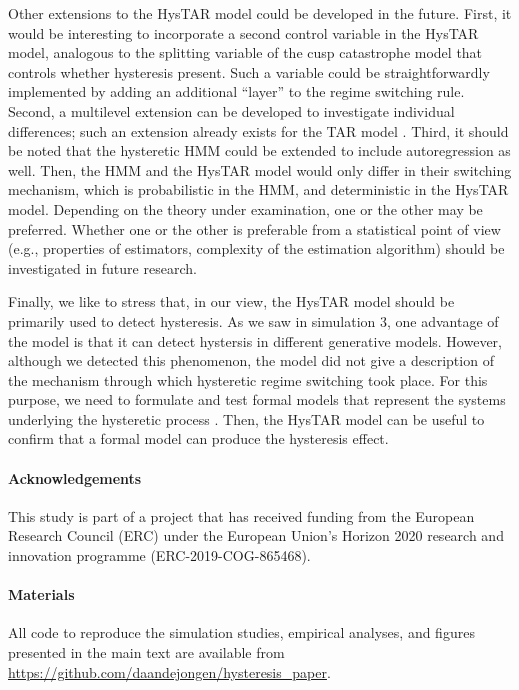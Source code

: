 \documentclass{article}
\begin{document}
Other extensions to the HysTAR model could be developed in the future.
First, it would be interesting to incorporate a second control variable in the HysTAR model, analogous to the splitting variable of the cusp catastrophe model that controls whether hysteresis present.
Such a variable could be straightforwardly implemented by adding an additional ``layer'' to the regime switching rule.
Second, a multilevel extension can be developed to investigate individual differences; such an extension already exists for the TAR model \citep{tar_affect_dyadic1}.
Third, it should be noted that the hysteretic HMM could be extended to include autoregression as well. Then, the HMM and the HysTAR model would only differ in their switching mechanism, which is probabilistic in the HMM, and deterministic in the HysTAR model. Depending on the theory under examination, one or the other may be preferred. Whether one or the other is preferable from a statistical point of view (e.g., properties of estimators, complexity of the estimation algorithm) should be investigated in future research.

Finally, we like to stress that, in our view, the HysTAR model should be primarily used to detect hysteresis.
As we saw in simulation 3, one advantage of the model is that it can detect hystersis in different generative models. However, although we detected this phenomenon, the model did not give a description of the mechanism through which hysteretic regime switching took place. 
For this purpose, we need to formulate and test formal models that represent the systems underlying the hysteretic process \citep{formal_theory_3, formal_theory_1, formal_theory_2, formal_theory_4}. Then, the HysTAR model can be useful to confirm that a formal model can produce the hysteresis effect.

\paragraph{Acknowledgements}
This study is part of a project that has received funding from the European Research Council (ERC) under the European Union's Horizon 2020 research and innovation programme (ERC-2019-COG-865468).
\paragraph{Materials} All code to reproduce the simulation studies, empirical analyses, and figures presented in the main text are available from \url{https://github.com/daandejongen/hysteresis_paper}.
\end{document}
